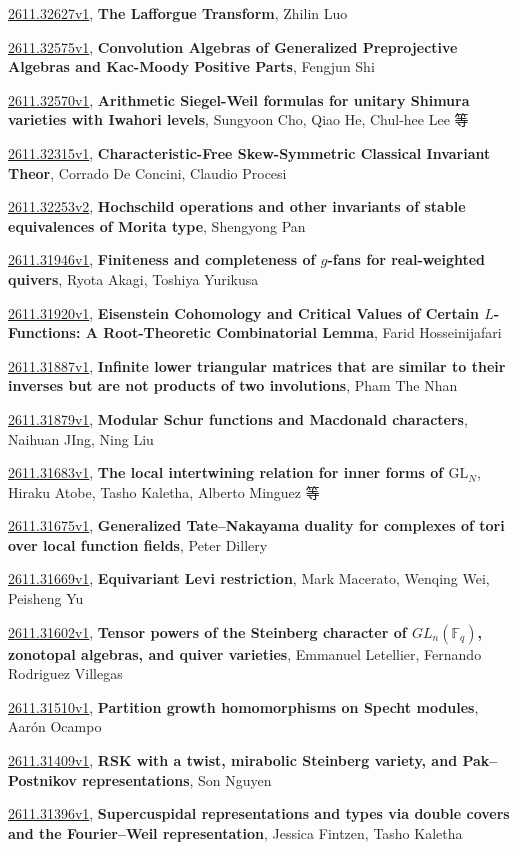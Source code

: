 \documentclass[9pt, a4paper]{article}
\theoremstyle{plain}
\theoremstyle{definition}
\theoremstyle{remark}
\newcommand{\arxiv}[3]{\href{https://arxiv.org/abs/#1}{#1}, \textbf{\textcolor{arxivblue}{#2}}, #3}
\begin{document}
\arxiv{2611.32627v1}{The Lafforgue Transform}{Zhilin Luo}

\arxiv{2611.32575v1}{Convolution Algebras of Generalized Preprojective Algebras and Kac-Moody Positive Parts}{Fengjun Shi}

\arxiv{2611.32570v1}{Arithmetic Siegel-Weil formulas for unitary Shimura varieties with Iwahori levels}{Sungyoon Cho, Qiao He, Chul-hee Lee 等}

\arxiv{2611.32315v1}{Characteristic-Free Skew-Symmetric Classical Invariant Theor}{Corrado De Concini, Claudio Procesi}

\arxiv{2611.32253v2}{Hochschild operations and other invariants of stable equivalences of Morita type}{Shengyong Pan}

\arxiv{2611.31946v1}{Finiteness and completeness of $g$-fans for real-weighted quivers}{Ryota Akagi, Toshiya Yurikusa}

\arxiv{2611.31920v1}{Eisenstein Cohomology and Critical Values of Certain \(L\)-Functions: A Root-Theoretic Combinatorial Lemma}{Farid Hosseinijafari}

\arxiv{2611.31887v1}{Infinite lower triangular matrices that are similar to their inverses but are not products of two involutions}{Pham The Nhan}

\arxiv{2611.31879v1}{Modular Schur functions and Macdonald characters}{Naihuan JIng, Ning Liu}

\arxiv{2611.31683v1}{The local intertwining relation for inner forms of $\mathrm{GL}_N$}{Hiraku Atobe, Tasho Kaletha, Alberto Minguez 等}

\arxiv{2611.31675v1}{Generalized Tate--Nakayama duality for complexes of tori over local function fields}{Peter Dillery}

\arxiv{2611.31669v1}{Equivariant Levi restriction}{Mark Macerato, Wenqing Wei, Peisheng Yu}

\arxiv{2611.31602v1}{Tensor powers of the Steinberg character of $GL_n(\mathbb{F}_q)$, zonotopal algebras, and quiver varieties}{Emmanuel Letellier, Fernando Rodriguez Villegas}

\arxiv{2611.31510v1}{Partition growth homomorphisms on Specht modules}{Aarón Ocampo}

\arxiv{2611.31409v1}{RSK with a twist, mirabolic Steinberg variety, and Pak--Postnikov representations}{Son Nguyen}

\arxiv{2611.31396v1}{Supercuspidal representations and types via double covers and the Fourier--Weil representation}{Jessica Fintzen, Tasho Kaletha}
\end{document}
